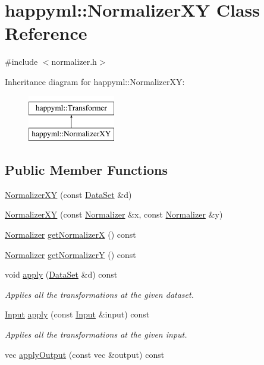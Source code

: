 \hypertarget{classhappyml_1_1NormalizerXY}{}\section{happyml\+:\+:Normalizer\+XY Class Reference}
\label{classhappyml_1_1NormalizerXY}


{\ttfamily \#include $<$normalizer.\+h$>$}

Inheritance diagram for happyml\+:\+:Normalizer\+XY\+:\begin{figure}[H]
\begin{center}
\leavevmode
\includegraphics[height=2.000000cm]{classhappyml_1_1NormalizerXY}
\end{center}
\end{figure}
\subsection*{Public Member Functions}
\begin{DoxyCompactItemize}
\item 
\hyperlink{classhappyml_1_1NormalizerXY_a6d6a78fc840a6a0c6eed005c4491de86}{Normalizer\+XY} (const \hyperlink{classhappyml_1_1DataSet}{Data\+Set} \&d)
\item 
\hyperlink{classhappyml_1_1NormalizerXY_aa565dd9fcfa196e0f6dfdc6084cb4c14}{Normalizer\+XY} (const \hyperlink{classhappyml_1_1Normalizer}{Normalizer} \&x, const \hyperlink{classhappyml_1_1Normalizer}{Normalizer} \&y)
\item 
\hyperlink{classhappyml_1_1Normalizer}{Normalizer} \hyperlink{classhappyml_1_1NormalizerXY_afd0208937e983073f1e1c919bca368d3}{get\+NormalizerX} () const 
\item 
\hyperlink{classhappyml_1_1Normalizer}{Normalizer} \hyperlink{classhappyml_1_1NormalizerXY_a29f7f1cf3c2fda6fc21cbf5e976ec7e7}{get\+NormalizerY} () const 
\item 
void \hyperlink{classhappyml_1_1NormalizerXY_ac843088ef9e2189ed719f4556ba111e2}{apply} (\hyperlink{classhappyml_1_1DataSet}{Data\+Set} \&d) const 
\begin{DoxyCompactList}\small\item\em Applies all the transformations at the given dataset. \end{DoxyCompactList}\item 
\hyperlink{namespacehappyml_a03602d1ec49393790b8a0449f40cd01f}{Input} \hyperlink{classhappyml_1_1NormalizerXY_a0f10be1b98dfc3125990310ee649ee8e}{apply} (const \hyperlink{namespacehappyml_a03602d1ec49393790b8a0449f40cd01f}{Input} \&input) const 
\begin{DoxyCompactList}\small\item\em Applies all the transformations at the given input. \end{DoxyCompactList}\item 
vec \hyperlink{classhappyml_1_1NormalizerXY_ad09b59cf6e131a52412b98670854c62a}{apply\+Output} (const vec \&output) const 
\end{DoxyCompactItemize}
